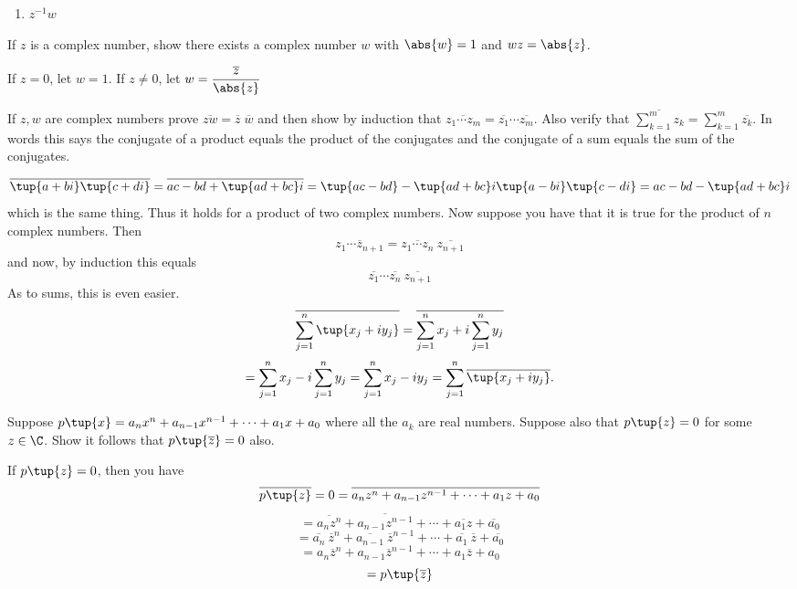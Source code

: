 \begin{enumialphparenastyle}
\begin{ex}
\begin{enumerate}
\item $z^{-1}w$

\end{enumerate}
\end{ex}

\begin{ex} If $z$ is a complex number, show there exists a complex
number $w$ with $\abs{w }=1$ and $wz=\abs{z}$. 
\begin{sol}
If $z=0$, let $w =1$. If $z\neq 0$, let $w =\displaystyle\frac{\overline{z}}{\abs{z}}$
\end{sol}
\end{ex}

\begin{ex} \label{exer-complex2}If $z,w$ are complex
 numbers prove $
\overline{zw}=\overline{z} \; \overline{w}$ and then show by induction that 
$\overline{z_{1}\cdots z_{m}}=\overline{z_{1}}\cdots \overline{z_{m}}$. Also
verify that $\overline{\sum_{k=1}^{m}z_{k}}=\sum_{k=1}^{m}\overline{z_{k}}$.
In words this says the conjugate of a product equals the product of the
conjugates and the conjugate of a sum equals the sum of the conjugates. 
\begin{sol}
\[
\overline{\tup{a+bi} \tup{c+di} }=\overline{ac-bd+\tup{
ad+bc}i }=\tup{ac-bd} -\tup{ad+bc}i \tup{
a-bi} \tup{c-di} =ac-bd-\tup{ad+bc}i 
\]
 which is the
same thing. Thus it holds for a product of two complex numbers. Now suppose
 you have that it is true for the product of $n$ complex numbers. Then
\[
\overline{z_{1}\cdots z_{n+1}}=\overline{z_{1}\cdots z_{n}}\ \overline{
z_{n+1}}
\]
and now, by induction this equals
\[
\overline{z_{1}}\cdots \overline{z_{n}}\ \overline{z_{n+1}}
\]
As to sums, this is even easier.
\[
\overline{\sum_{j=1}^{n}\tup{x_{j}+iy_{j}} }=\overline{%
\sum_{j=1}^{n}x_{j}+i\sum_{j=1}^{n}y_{j}}
\]
\[
=\sum_{j=1}^{n}x_{j}-i\sum_{j=1}^{n}y_{j}=\sum_{j=1}^{n}x_{j}-iy_{j}=
\sum_{j=1}^{n}\overline{\tup{x_{j}+iy_{j}} }.
\]
\end{sol}
\end{ex}

\begin{ex} \label{15-july-prob2}Suppose $p\tup{x}
=a_{n}x^{n}+a_{n-1}x^{n-1}+\cdots +a_{1}x+a_{0}$ where all the $a_{k}$ are
real numbers. Suppose also that $p\tup{z} =0$ for some $z\in \C$. Show it follows that $p\tup{\overline{z}} =0$ also. 
\begin{sol}
If $p\tup{z} =0$, then you have
\[
\overline{p\tup{z} }=0=\overline{a_{n}z^{n}+a_{n-1}z^{n-1}+\cdots
+a_{1}z+a_{0}}
\]
\[
=\overline{a_{n}z^{n}}+\overline{a_{n-1}z^{n-1}}+\cdots +\overline{a_{1}z}+
\overline{a_{0}}
\]
\[
=\overline{a_{n}}\ \overline{z}^{n}+\overline{a_{n-1}}\ \overline{z}
^{n-1}+\cdots +\overline{a_{1}}\ \overline{z}+\overline{a_{0}}
\]
\[
=a_{n}\overline{z}^{n}+a_{n-1}\overline{z}^{n-1}+\cdots +a_{1}\overline{z}
+a_{0}
\]
\[
=p\tup{\overline{z}}
\]
\end{sol}
\end{ex}


\end{enumialphparenastyle}

